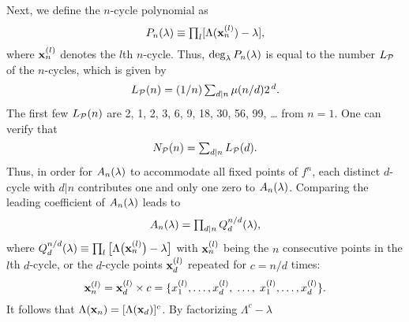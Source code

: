 \documentclass{ws-ijbc}
\begin{document}
Next, we define the $n$-cycle polynomial as
\begin{equation}
  P_n(\lambda) \equiv \textstyle\prod_l [
    \Lambda(\mathbf{x}_{n}^{(l)}) - \lambda
  ],
\notag
\end{equation}
where $\mathbf{x}_{n}^{(l)}$ denotes the $l$th $n$-cycle.
%
Thus, $\deg_\lambda P_n(\lambda)$
  is equal to the number $L_\mathcal P$ of the $n$-cycles,
  which is given by
  \cite{hao, hao2, lutzky}
\begin{equation}
  L_\mathcal P(n) = (1/n)\textstyle\sum_{d | n} \mu(n/d) 2^{\,d}.
\label{eq:lyndon}
\end{equation}
%
%
%
The first few $L_\mathcal P(n)$ are
2, 1, 2, 3, 6, 9, 18, 30, 56, 99, \dots %
from $n = 1$.
%
%
One can verify that
\begin{equation}
  N_\mathcal P(n) = \textstyle\sum_{d|n} L_\mathcal P(d).
\notag
\end{equation}
%
Thus, in order for $A_n(\lambda)$ to accommodate all fixed points of $f^n$,
  each distinct $d$-cycle with $d|n$
  contributes one and only one zero to $A_n(\lambda)$.
%
%
Comparing the leading coefficient of $A_n(\lambda)$ leads to
  \begin{equation}
    A_n(\lambda) = \textstyle\prod_{d|n} Q_d^{n/d}(\lambda),
    \label{eq:prod}
  \end{equation}
where $Q_d^{n/d}(\lambda) \equiv \prod_l
  \big[\Lambda\big(\mathbf{x}_{n}^{(l)}\big) - \lambda\big]$
  with $\mathbf{x}_{n}^{(l)}$ being the $n$ consecutive points
  in the $l$th $d$-cycle,
%
  or the $d$-cycle points $\mathbf{x}_{d}^{(l)}$
  repeated for $c = n/d$ times:
\begin{equation}
  \mathbf{x}_{n}^{(l)}
  =
  \mathbf{x}_{d}^{(l)} \times c
  =
  \{
    x_1^{(l)}, \ldots, x_d^{(l)},
    \; \ldots, \;
    x_1^{(l)}, \ldots, x_d^{(l)}
  \}.
\notag
\end{equation}
%
It follows that
$\Lambda(\mathbf{x}_{n}) = [ \Lambda(\mathbf{x}_{d}) ]^c$.
%
By factorizing $\Lambda^c - \lambda$
\end{document}
